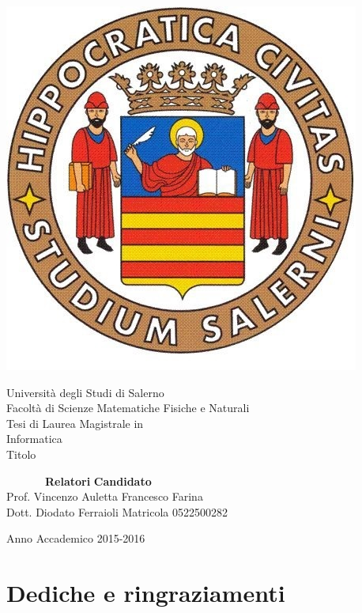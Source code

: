 \documentclass[11pt,oneside]{book}
\begin{document}

\begin{titlepage}
\begin{center}
\begin{center}
\includegraphics[scale=0.28, natwidth=793, natheight=1123]{img/logounisa.jpg}
\end{center}
{\Large Universit\`a degli Studi di Salerno}\\[0.2truecm]
{\large Facolt\`a di Scienze Matematiche Fisiche e Naturali}\\
\hrulefill
\vfill
{\large Tesi di Laurea Magistrale in}\\[0.2truecm]
{\Large Informatica}\\
\vfill\vfill
{\Huge Titolo}
\vfill\vfill


\ \ \ \ \ \ \ {\bf Relatori} \hfill {\bf Candidato}\ \ \\
Prof. Vincenzo Auletta \hfill Francesco Farina\\
Dott. Diodato Ferraioli \hfill Matricola 0522500282

\vfill
\hrulefill 

Anno Accademico 2015-2016

\end{center}
\end{titlepage}


\chapter*{Dediche e ringraziamenti}
\vfill
\end{document}
